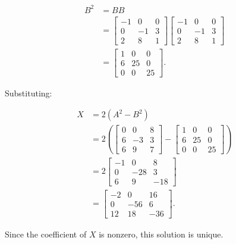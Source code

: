 \begin{answer}
    $$
    \begin{aligned}
        B^2 &= BB \\
        &= \begin{bmatrix}
            -1 & 0 & 0 \\
            0 & -1 & 3 \\
            2 & 8 & 1
        \end{bmatrix}
        \begin{bmatrix}
            -1 & 0 & 0 \\
            0 & -1 & 3 \\
            2 & 8 & 1
        \end{bmatrix} \\[1em]
        &= \begin{bmatrix}
            1 & 0 & 0 \\
            6 & 25 & 0 \\
            0 & 0 & 25
        \end{bmatrix}.
    \end{aligned}
    $$

    Substituting:

    $$
    \begin{aligned}
        X &= 2(A^2 - B^2) \\[0.5em]
          &= 2\left(
            \begin{bmatrix}
                0 & 0 & 8 \\
                6 & -3 & 3 \\
                6 & 9 & 7
            \end{bmatrix}
            -
            \begin{bmatrix}
                1 & 0 & 0 \\
                6 & 25 & 0 \\
                0 & 0 & 25
            \end{bmatrix}
          \right) \\[1em]
          &= 2\begin{bmatrix}
              -1 & 0 & 8 \\
              0 & -28 & 3 \\
              6 & 9 & -18
          \end{bmatrix} \\[1em]
          &= \boxed{
            \begin{bmatrix}
                -2 & 0 & 16 \\
                0 & -56 & 6 \\
                12 & 18 & -36
            \end{bmatrix}
          }.
    \end{aligned}
    $$

    Since the coefficient of $X$ is nonzero,
    this solution is unique.
\end{answer}